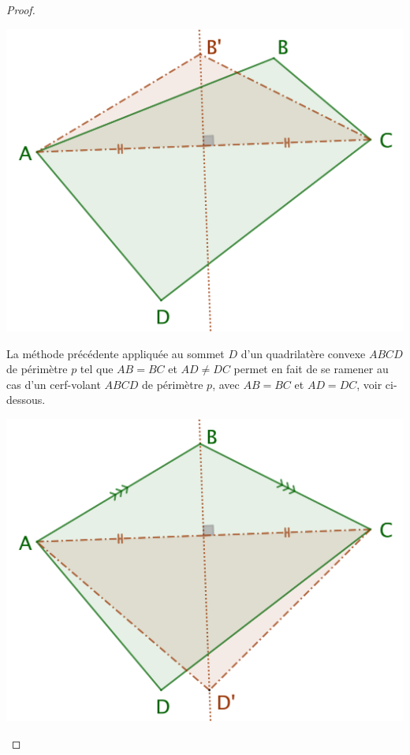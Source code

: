 \begin{proof}
	\begin{center}
		\includegraphics[scale=.4]{content/quadrilateral/convex-gene.png}
	\end{center}
	
	
	La méthode précédente appliquée au sommet $D$ d'un quadrilatère convexe $ABCD$ de périmètre $p$ tel que $AB = BC$ et $AD \neq DC$ permet en fait de se ramener au cas d'un cerf-volant $ABCD$ de périmètre $p$, avec $AB = BC$ et $AD = DC$, voir ci-dessous. 

	\begin{center}
		\includegraphics[scale=.4]{content/quadrilateral/convex-one-paire.png}
	\end{center}
	

\end{proof}
